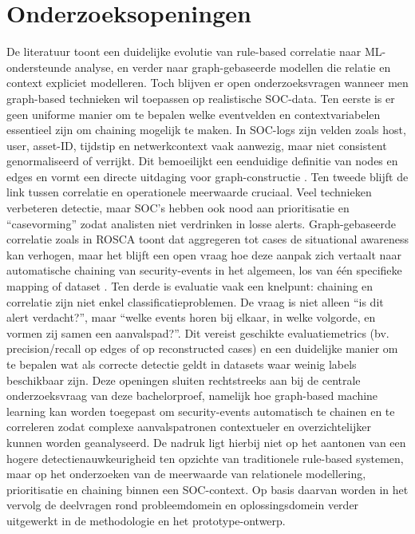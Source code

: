 \section{Onderzoeksopeningen}
De literatuur toont een duidelijke evolutie van rule-based correlatie naar ML-ondersteunde analyse, en verder naar graph-gebaseerde modellen die relatie en context expliciet modelleren. Toch blijven er open onderzoeksvragen wanneer men graph-based technieken wil toepassen op realistische SOC-data.
\newline
\newline
Ten eerste is er geen uniforme manier om te bepalen welke eventvelden en contextvariabelen essentieel zijn om chaining mogelijk te maken. In SOC-logs zijn velden zoals host, user, asset-ID, tijdstip en netwerkcontext vaak aanwezig, maar niet consistent genormaliseerd of verrijkt. Dit bemoeilijkt een eenduidige definitie van nodes en edges en vormt een directe uitdaging voor graph-constructie \autocite{Omoseebi2022}.
\newline
\newline
Ten tweede blijft de link tussen correlatie en operationele meerwaarde cruciaal. Veel technieken verbeteren detectie, maar SOC’s hebben ook nood aan prioritisatie en “casevorming” zodat analisten niet verdrinken in losse alerts. Graph-gebaseerde correlatie zoals in ROSCA toont dat aggregeren tot cases de situational awareness kan verhogen, maar het blijft een open vraag hoe deze aanpak zich vertaalt naar automatische chaining van security-events in het algemeen, los van één specifieke mapping of dataset \autocite{Garcia2025ROSCA}.
\newline
\newline
Ten derde is evaluatie vaak een knelpunt: chaining en correlatie zijn niet enkel classificatieproblemen. De vraag is niet alleen “is dit alert verdacht?”, maar “welke events horen bij elkaar, in welke volgorde, en vormen zij samen een aanvalspad?”. Dit vereist geschikte evaluatiemetrics (bv. precision/recall op edges of op reconstructed cases) en een duidelijke manier om te bepalen wat als correcte detectie geldt in datasets waar weinig labels beschikbaar zijn.
\newline
\newline
Deze openingen sluiten rechtstreeks aan bij de centrale onderzoeksvraag van deze bachelorproef, namelijk hoe graph-based machine learning kan worden toegepast om security-events automatisch te chainen en te correleren zodat complexe aanvalspatronen contextueler en overzichtelijker kunnen worden geanalyseerd.
\newline
\newline
De nadruk ligt hierbij niet op het aantonen van een hogere detectienauwkeurigheid ten opzichte van traditionele rule-based systemen, maar op het onderzoeken van de meerwaarde van relationele modellering, prioritisatie en chaining binnen een SOC-context. Op basis daarvan worden in het vervolg de deelvragen rond probleemdomein en oplossingsdomein verder uitgewerkt in de methodologie en het prototype-ontwerp.




